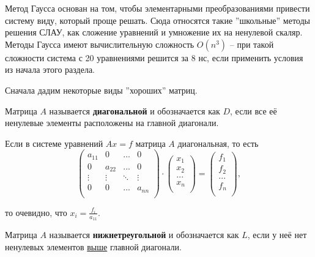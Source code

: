 \documentclass{article}
\begin{document}
Метод Гаусса основан на том, чтобы элементарными преобразованиями привести
систему виду, который проще решать. Сюда относятся такие ''школьные'' методы
решения СЛАУ, как сложение уравнений и умножение их на ненулевой скаляр. Методы
Гаусса имеют вычислительную сложность $O(n^3)$ -- при такой сложности система
с 20 уравнениями решится за 8 нс, если применить условия из начала этого
раздела.

Сначала дадим некоторые виды ''хороших'' матриц.

\begin{define}
	Матрица $A$ называется \textbf{диагональной} и обозначается как $D$,
	если все её ненулевые элементы расположены на главной диагонали.
\end{define}

Если в системе уравнений $Ax=f$ матрица $A$ диагональная, то есть
\[
	\begin{pmatrix}
		a_{11}	& 0	& ...	& 0 \\
		0	& a_{22}& ...	& 0 \\
		\vdots	& \vdots&\ddots &\vdots \\
		0	& 0	& ...	& a_{nn} \\
	\end{pmatrix}
	\cdot
	\begin{pmatrix}
		x_1 \\
		x_2 \\
		... \\
		x_n \\
	\end{pmatrix}
	=
	\begin{pmatrix}
		f_1 \\
		f_2 \\
		... \\
		f_n \\
	\end{pmatrix}
	,
\]

то очевидно, что $x_i=\frac{f_i}{a_{11}}$.

\begin{define}
	Матрица $A$ называется \textbf{нижнетреугольной} и обозначается как $L$,
	если у неё нет ненулевых элементов \underline{выше} главной диагонали.
\end{define}

\newpage
\end{document}
